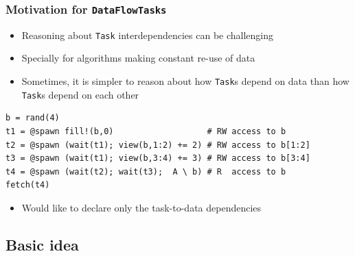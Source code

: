 \documentclass{beamer}
\begin{document}
\begin{frame}[fragile]
\frametitle{Motivation for \texttt{DataFlowTasks}}

\begin{itemize}
    \item Reasoning about \texttt{Task} interdependencies can be
    challenging
    \item Specially for algorithms making constant re-use of data   
    \item Sometimes, it is simpler to reason about how \texttt{Task}s depend on data than how \texttt{Task}s depend on each other
\end{itemize}

\begin{example}
\begin{verbatim}    
b = rand(4)
t1 = @spawn fill!(b,0)                   # RW access to b
t2 = @spawn (wait(t1); view(b,1:2) += 2) # RW access to b[1:2]
t3 = @spawn (wait(t1); view(b,3:4) += 3) # RW access to b[3:4]
t4 = @spawn (wait(t2); wait(t3);  A \ b) # R  access to b
fetch(t4)
\end{verbatim}
\end{example}

\begin{itemize}
  \item<2-> \alert{Would like to declare only the task-to-data dependencies}
\end{itemize}

\end{frame}

\subsection{Basic idea}
\end{document}
